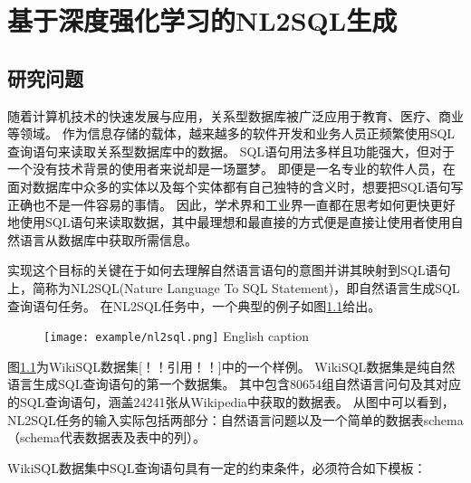 
\chapter{基于深度强化学习的NL2SQL生成}
\label{chap:enl2sql}

\section{研究问题}

随着计算机技术的快速发展与应用，关系型数据库被广泛应用于教育、医疗、商业等领域。
作为信息存储的载体，越来越多的软件开发和业务人员正频繁使用SQL查询语句来读取关系型数据库中的数据。
SQL语句用法多样且功能强大，但对于一个没有技术背景的使用者来说却是一场噩梦。
即便是一名专业的软件人员，在面对数据库中众多的实体以及每个实体都有自己独特的含义时，想要把SQL语句写正确也不是一件容易的事情。
因此，学术界和工业界一直都在思考如何更快更好地使用SQL语句来读取数据，其中最理想和最直接的方式便是直接让使用者使用自然语言从数据库中获取所需信息。

实现这个目标的关键在于如何去理解自然语言语句的意图并讲其映射到SQL语句上，简称为NL2SQL(Nature Language To SQL Statement)，即自然语言生成SQL查询语句任务。
在NL2SQL任务中，一个典型的例子如图\ref{fig:nl2sqlexample}给出。

\begin{figure}[!htp]
    \centering
    \texttt{[image: example/nl2sql.png]}
      {English caption}
    \label{fig:nl2sqlexample}
  \end{figure}

图\ref{fig:nl2sqlexample}为WikiSQL数据集[！！引用！！]中的一个样例。
WikiSQL数据集是纯自然语言生成SQL查询语句的第一个数据集。
其中包含80654组自然语言问句及其对应的SQL查询语句，涵盖24241张从Wikipedia中获取的数据表。
从图中可以看到，NL2SQL任务的输入实际包括两部分：自然语言问题以及一个简单的数据表schema（schema代表数据表及表中的列）。

WikiSQL数据集中SQL查询语句具有一定的约束条件，必须符合如下模板：

